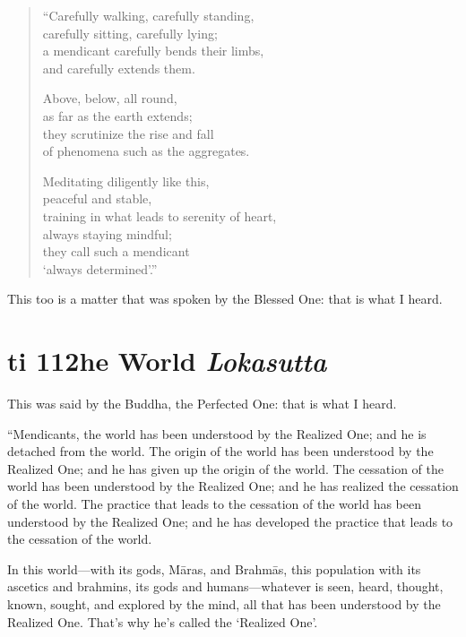 \documentclass[12pt,openany]{book}%
\newcommand*{\suttatitleacronym}[1]{\smaller[2]{#1}\vspace*{.3em}}
\newcommand*{\suttatitletranslation}[1]{\linebreak{#1}}
\newcommand*{\suttatitleroot}[1]{\linebreak\smaller[2]\itshape{#1}}
\newcommand*{\tocacronym}[1]{\hspace*{-3.3em}{#1}\quad}
\newcommand*{\toctranslation}[1]{#1}
\newcommand*{\tocroot}[1]{(\textit{#1})}
\begin{document}
\begin{verse}%
“Carefully walking, carefully standing, \\
carefully sitting, carefully lying; \\
a mendicant carefully bends their limbs, \\
and carefully extends them. 

Above, below, all round, \\
as far as the earth extends; \\
they scrutinize the rise and fall \\
of phenomena such as the aggregates. 

Meditating diligently like this, \\
peaceful and stable, \\
training in what leads to serenity of heart, \\
always staying mindful; \\
they call such a mendicant \\
‘always determined’.” 

%
\end{verse}

This too is a matter that was spoken by the Blessed One: that is what I heard. 

%
\section*{{\suttatitleacronym Iti 112}{\suttatitletranslation The World }{\suttatitleroot Lokasutta}}
\addcontentsline{toc}{section}{\tocacronym{Iti 112} \toctranslation{The World } \tocroot{Lokasutta}}

This was said by the Buddha, the Perfected One: that is what I heard. 

“Mendicants, the world has been understood by the Realized One; and he is detached from the world. The origin of the world has been understood by the Realized One; and he has given up the origin of the world. The cessation of the world has been understood by the Realized One; and he has realized the cessation of the world. The practice that leads to the cessation of the world has been understood by the Realized One; and he has developed the practice that leads to the cessation of the world. 

In this world—with its gods, \textsanskrit{Māras}, and \textsanskrit{Brahmās}, this population with its ascetics and brahmins, its gods and humans—whatever is seen, heard, thought, known, sought, and explored by the mind, all that has been understood by the Realized One. That’s why he’s called the ‘Realized One’. 
\end{document}
